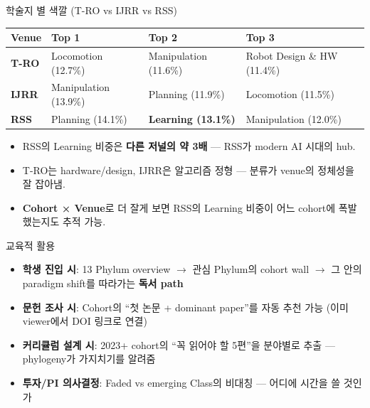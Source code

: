 \documentclass[aspectratio=169,t]{beamer}
\newcommand{\hot}[1]{\textcolor{accentorange}{\textbf{#1}}}
\newcommand{\cool}[1]{\textcolor{accentblue}{\textbf{#1}}}
\begin{document}
\begin{frame}{학술지 별 색깔 (T-RO vs IJRR vs RSS)}
\small
\begin{tabular}{@{}llll@{}}
\toprule
\textbf{Venue} & \textbf{Top 1} & \textbf{Top 2} & \textbf{Top 3} \\
\midrule
\textbf{T-RO}  & Locomotion (12.7\%)         & Manipulation (11.6\%)        & Robot Design \& HW (11.4\%) \\
\textbf{IJRR}  & Manipulation (13.9\%)       & Planning (11.9\%)            & Locomotion (11.5\%) \\
\textbf{RSS}   & Planning (14.1\%)           & \hot{Learning (13.1\%)}      & Manipulation (12.0\%) \\
\bottomrule
\end{tabular}
\vfill
\begin{itemize}
\item RSS의 Learning 비중은 \hot{다른 저널의 약 3배} — RSS가 modern AI 시대의 hub.
\item T-RO는 hardware/design, IJRR은 알고리즘 정형 — 분류가 venue의 정체성을 잘 잡아냄.
\item \cool{Cohort × Venue}로 더 잘게 보면 RSS의 Learning 비중이 어느 cohort에 폭발했는지도 추적 가능.
\end{itemize}
\end{frame}

\begin{frame}{교육적 활용}
\begin{itemize}
  \item \cool{학생 진입 시}: 13 Phylum overview $\to$ 관심 Phylum의 cohort wall $\to$ 그 안의 paradigm shift를 따라가는 \hot{독서 path}
  \item \cool{문헌 조사 시}: Cohort의 ``첫 논문 + dominant paper''를 자동 추천 가능 (이미 viewer에서 DOI 링크로 연결)
  \item \cool{커리큘럼 설계 시}: 2023+ cohort의 ``꼭 읽어야 할 5편''을 분야별로 추출 — phylogeny가 가지치기를 알려줌
  \item \cool{투자/PI 의사결정}: Faded vs emerging Class의 비대칭 — 어디에 시간을 쓸 것인가
\end{itemize}
\end{frame}
\end{document}
